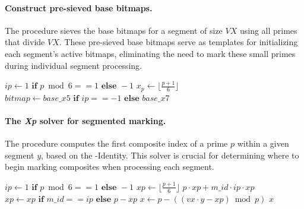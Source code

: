\documentclass{article}
\begin{document}
\paragraph{Construct pre-sieved base bitmaps.}

The  procedure sieves the base bitmaps for a segment of size $VX$ using all primes that divide $VX$. These pre-sieved base bitmaps serve as templates for initializing each segment's active bitmaps, eliminating the need to mark these small primes during individual segment processing.

\begin{algorithmic}[1]
         
            \State $ip \gets 1 \textbf{ if } p \bmod 6 == 1 \textbf{ else } -1$
            \State $x_p \gets \lfloor\frac{p + 1}{6}\rfloor$
            \State $bitmap \gets base\_x5 \textbf{ if } ip == -1 \textbf{ else } base\_x7$ 
            \State {} 
            \State {}
            \State {} 
            \State {}
        \EndFor
    \EndProcedure
\end{algorithmic}

\paragraph{The \emph{Xp} solver for segmented marking.}

The  procedure computes the first composite index of a prime $p$ within a given segment $y$, based on the \Xp-Identity. This solver is crucial for determining where to begin marking composites when processing each segment.

\begin{algorithmic}[1]
        \State $ip \gets 1 \textbf{ if } p \bmod 6 == 1 \textbf{ else } -1$
        \State $xp \gets \lfloor\frac{p + 1}{6}\rfloor$
            \State \Return $p \cdot xp + m\_id \cdot ip \cdot xp$  
        \EndIf
        \State $xp \gets xp \textbf{ if } m\_id == ip \textbf{ else } p - xp$ 
        \State $x \gets p - ((vx \cdot y - xp) \bmod p)$ 
        \State \Return $x$
    \EndProcedure
\end{algorithmic}
\end{document}
